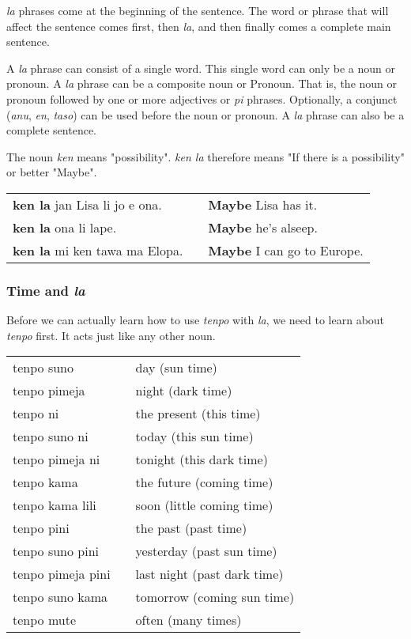 \textit{la} phrases come at the beginning of the sentence. 
The word or phrase that will affect the sentence comes first, then \textit{la}, and then finally comes a complete main sentence. 

A \textit{la} phrase can consist of a single word. This single word can only be a noun or pronoun.
A \textit{la} phrase can be a composite noun or Pronoun. That is, the noun or pronoun followed by one or more adjectives or \textit{pi} phrases.
Optionally, a conjunct (\textit{anu}, \textit{en}, \textit{taso}) can be used before the noun or pronoun.
A \textit{la} phrase can also be a complete sentence.

The noun \textit{ken} means "possibility".
\textit{ken la} therefore means "If there is a possibility" or better "Maybe".
 
\begin{supertabular}{p{5,5cm}|ll}
\textbf{ken la} jan Lisa li jo e ona. && \textbf{Maybe} Lisa has it. \\
\textbf{ken la} ona li lape. && \textbf{Maybe} he's alseep. \\
\textbf{ken la} mi ken tawa ma Elopa. && \textbf{Maybe} I can go to Europe. \\
\end{supertabular} 
%
\subsubsection*{Time and \textit{la}}
%
Before we can actually learn how to use \textit{tenpo} with \textit{la}, we need to learn about \textit{tenpo} first. 
It acts just like any other noun. 

\begin{supertabular}{p{5,5cm}|ll}
tenpo suno && day (sun time) \\
tenpo pimeja && night (dark time) \\
tenpo ni && the present (this time) \\
tenpo suno ni && today (this sun time) \\
tenpo pimeja ni && tonight (this dark time) \\
tenpo kama && the future (coming time) \\
tenpo kama lili && soon (little coming time) \\
tenpo pini && the past (past time) \\
tenpo suno pini && yesterday (past sun time) \\
tenpo pimeja pini && last night (past dark time) \\
tenpo suno kama && tomorrow (coming sun time) \\
tenpo mute && often (many times) \\
\end{supertabular} 

